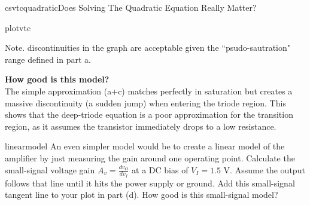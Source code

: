\begin{mainquestion}{csvtcquadratic}{Does Solving The Quadratic Equation Really Matter?}
\begin{partquestion}{plotvtc}
\begin{answer}[3.5in]
        \begin{center}
        \end{center}
        
        Note. discontinuities in the graph are acceptable given the ``psudo-sautration" range defined in part a.
        
        \textbf{How good is this model?} \\
        The simple approximation (a+c) matches perfectly in saturation but creates a massive discontinuity (a sudden jump) when entering the triode region. This shows that the deep-triode equation is a poor approximation for the transition region, as it assumes the transistor immediately drops to a low resistance. 
\end{answer}

\end{partquestion}

\begin{partquestion}{linearmodel}
{An even simpler model would be to create a linear model of the amplifier by just measuring the gain around one operating point. Calculate the small-signal voltage gain $A_v = \frac{dv_O}{dv_I}$ at a DC bias of $V_I = 1.5 \text{ V}$. Assume the output follows that line until it hits the power supply or ground. Add this small-signal tangent line to your plot in part (d). How good is this small-signal model?}


\end{partquestion}
\end{mainquestion}
